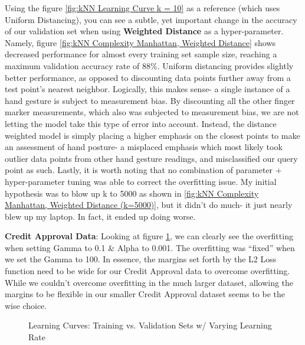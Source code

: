 \documentclass[letterpaper,12pt]{article}
\begin{document}
Using the figure \ref{fig:kNN Learning Curve k = 10} as a reference (which uses Uniform Distancing), you can see a subtle, yet important change in the accuracy of our validation set when using \textbf{Weighted Distance} as a hyper-parameter.  Namely, figure \ref{fig:kNN Complexity Manhattan, Weighted Distance} shows decreased performance for almost every training set sample size, reaching a maximum validation accuracy rate of 88\%.  Uniform distancing provides slightly better performance, as opposed to discounting data points further away from a test point's nearest neighbor.  Logically, this makes sense- a single instance of a hand gesture is subject to measurement bias.  By discounting all the other finger marker measurements, which also was subjected to measurement bias, we are not letting the model take this type of error into account.  Instead, the distance weighted model is simply placing a higher emphasis on the closest points to make an assessment of hand posture- a misplaced emphasis which most likely took outlier data points from other hand gesture readings, and misclassified our query point as such.  Lastly, it is worth noting that no combination of parameter + hyper-parameter tuning was able to correct the overfitting issue.  My initial hypothesis was to blow up k to 5000 as shown in \ref{fig:kNN Complexity Manhattan, Weighted Distance (k=5000)}, but it didn't do much- it just nearly blew up my laptop.  In fact, it ended up doing worse.

\textbf{Credit Approval Data}:  Looking at figure \ref{fig:CC SVM Complexity Curves}, we can clearly see the overfitting when setting Gamma to 0.1 \& Alpha to 0.001.  The overfitting was ``fixed'' when we set the Gamma to 100.  In essence, the margins set forth by the L2 Loss function need to be wide for our Credit Approval data to overcome overfitting.  While we couldn't overcome overfitting in the much larger dataset, allowing the margins to be flexible in our smaller Credit Approval dataset seems to be the wise choice.  

\begin{figure} %
  \centering
  \hspace{8pt}%
  \caption{Learning Curves:  Training vs. Validation Sets w/ Varying Learning Rate}\label{fig:CC SVM Complexity Curves}
\end{figure}
\end{document}
